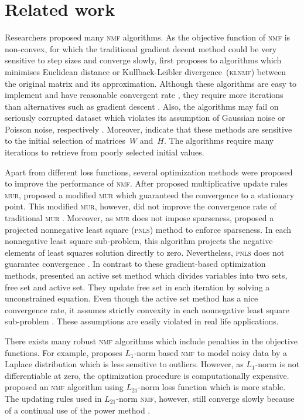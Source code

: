 \section{Related work}
Researchers proposed many \textsc{nmf} algorithms. As the objective function of \textsc{nmf} is non-convex, for which the traditional gradient decent method could be very sensitive to step sizes and converge slowly, \citet{lee2001algorithms} first proposes to algorithms which minimises Euclidean distance or Kullback-Leibler divergence~(\textsc{klnmf}) between the original matrix and its approximation. Although these algorithms are easy to implement and have reasonable convergent rate \citep{lee2001algorithms}, they require more iterations than alternatives such as gradient descent \citep{berry2007algorithms}. Also, the algorithms may fail on seriously corrupted dataset which violates its assumption of Gaussian noise or Poisson noise, respectively \citep{guan2017truncated}. Moreover, \citet{yang2011kullback} indicate that these methods are sensitive to the initial selection of matrices~$W$ and~$H$. The algorithms require many iterations to retrieve from poorly selected initial values.

Apart from different loss functions, several optimization methods were proposed to improve the performance of \textsc{nmf}. After \citet{lee2001algorithms} proposed multiplicative update rules \textsc{mur}, \citet{ lin2007convergence} proposed a modified \textsc{mur} which guaranteed the convergence to a stationary point. This modified \textsc{mur}, however, did not improve the convergence rate of traditional \textsc{mur} \citep{guan2012nenmf}. Moreover, as \textsc{mur} does not impose sparseness, \citet{berry2007algorithms} proposed a projected nonnegative least square (\textsc{pnls}) method to enforce sparseness. In each nonnegative least square sub-problem, this algorithm projects the negative elements of least squares solution directly to zero. Nevertheless, \textsc{pnls} does not guarantee convergence \citep{guan2012nenmf}. In contrast to these gradient-based optimization methods, \citet{kim2008nonnegative} presented an active set method which divides variables into two sets, free set and active set. They update free set in each iteration by solving a unconstrained equation. Even though the active set method has a nice convergence rate, it assumes strictly convexity in each nonnegative least square sub-problem \citep{kim2008nonnegative}. These assumptions are easily violated in real life applications.

There exists many robust \textsc{nmf} algorithms which include penalties in the objective functions. For example, \citet{lam2008non} proposes ${L_1}$-norm based \textsc{nmf} to model noisy data by a Laplace distribution which is less sensitive to outliers. However, as $L_1$-norm is not differentiable at zero, the optimization procedure is computationally expensive. \citet{kong2011robust} proposed an \textsc{nmf} algorithm using $L_{21}$-norm loss function which is more stable. The updating rules used in $L_{21}$-norm \textsc{nmf}, however, still converge slowly because of a continual use of the power method \citep{guan2017truncated}.


